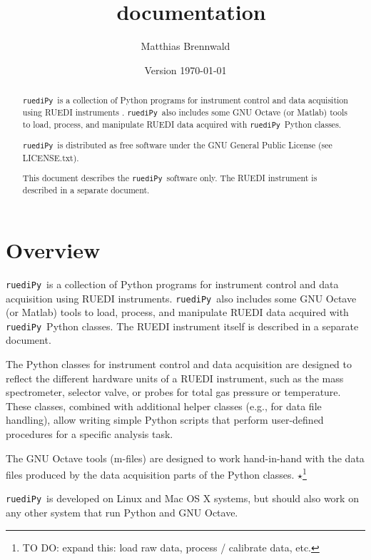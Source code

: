 \documentclass[12pt]{article}   	%
\title{\ruediPy\ documentation}
\author{Matthias Brennwald}
\date{Version \today}							%
\newcommand{\ruediPy}{\texttt{ruediPy}}
\newcommand{\work}[1]{{\Large\bf\ensuremath{\star}}\footnote{TO DO: #1}}
\begin{document}
\maketitle

\begin{abstract}
\ruediPy\ is a collection of Python programs for instrument control and data acquisition using RUEDI instruments \citep{Brennwald:2016a}. \ruediPy\ also includes some GNU Octave (or Matlab) tools to load, process, and manipulate RUEDI data acquired with \ruediPy\ Python classes.\par

\ruediPy\ is distributed as free software under the GNU General Public License (see LICENSE.txt).

This document describes the \ruediPy\ software only. The RUEDI instrument is described in a separate document\citep{Brennwald:2016a}.


\end{abstract}

\tableofcontents

\clearpage

\section{Overview}
\ruediPy\ is a collection of Python programs for instrument control and data acquisition using RUEDI instruments. \ruediPy\ also includes some GNU Octave (or Matlab) tools to load, process, and manipulate RUEDI data acquired with \ruediPy\ Python classes. The RUEDI instrument itself is described in a separate document\citep{Brennwald:2016a}.\par

The Python classes for instrument control and data acquisition are designed to reflect the different hardware units of a RUEDI instrument, such as the mass spectrometer, selector valve, or probes for total gas pressure or temperature. These classes, combined with additional helper classes (e.g., for data file handling), allow writing simple Python scripts that perform user-defined procedures for a specific analysis task.\par

The GNU Octave tools (m-files) are designed to work hand-in-hand with the data files produced by the data acquisition parts of the Python classes. \work{expand this: load raw data, process / calibrate data, etc.}

\ruediPy\ is developed on Linux and Mac OS X systems, but should also work on any other system that run Python and GNU Octave.
\end{document}
